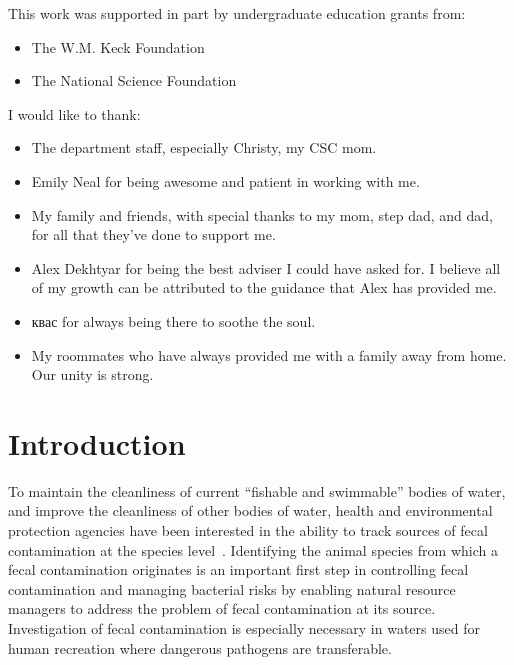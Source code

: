 \documentclass[12pt]{ucthesis}
\begin{document}
\begin{frontmatter}
   \begin{acknowledgements}
      This work was supported in part by undergraduate education grants from:
      \begin{itemize}
         \item The W.M. Keck Foundation
         \item The National Science Foundation
      \end{itemize}
      I would like to thank:
      \begin{itemize}
         \item The department staff, especially Christy, my CSC mom.
         \item Emily Neal for being awesome and patient in working with me.
         \item My family and friends, with special thanks to my mom, step dad,
               and dad, for all that they've done to support me.
         \item Alex Dekhtyar for being the best adviser I could have asked for.
               I believe all of my growth can be attributed to the guidance
               that Alex has provided me.
         \item \foreignlanguage{russian}{квас} for always being there to soothe the soul.
         \item My roommates who have always provided me with a family away from
               home. Our unity is strong.
      \end{itemize}
   \end{acknowledgements}

   \tableofcontents

   \listoftables
   \listoffigures
\end{frontmatter}

\pagestyle{plain}

\renewcommand{\baselinestretch}{1.66}


\chapter{Introduction}\label{chap:intro}
   To maintain the cleanliness of current ``fishable and swimmable'' bodies of
   water, and improve the cleanliness of other bodies of water, health and
   environmental protection agencies have been interested in the ability to
   track sources of fecal contamination at the species
   level~\cite{Scott:CurrentMST, Simpson:StateOf, Desmarais:SoilInfluence}.
   Identifying the animal species from which a fecal contamination originates
   is an important first step in controlling fecal contamination and managing
   bacterial risks by enabling natural resource managers to address the problem
   of fecal contamination at its source. Investigation of fecal contamination
   is especially necessary in waters used for human recreation where dangerous
   pathogens are transferable. 
\end{document}
